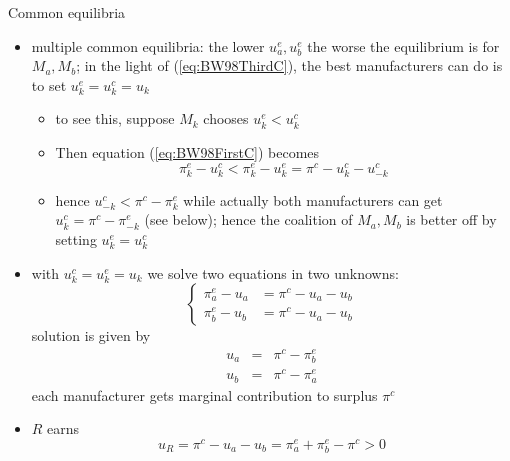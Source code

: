 \documentclass[11pt,english]{beamer}
\begin{document}
\begin{frame}[allowframebreaks]{Common equilibria}
\begin{itemize}
\begin{itemize}
\begin{equation*}
        \pi^c = \pi_a^e + [u_a^c-u_a^e] + u_b^c \geq \pi_a^e
      \end{equation*}
      because $u_a^c \geq u_a^e$ and $u_b^c \geq 0$
    \item suppose $\pi^c < \pi_a^e$, coalition $R$ and $M_a$ can
      deviate from common outcome and earn $\pi_a^e > \pi^c -u_b^c$
    \end{itemize}
  \item multiple common equilibria: the lower $u_a^e,u_b^e$ the worse
    the equilibrium is for $M_a,M_b$; in the light of
    (\ref{eq:BW98ThirdC}), the best manufacturers can do is to
    set $u_k^e=u_k^c=u_k$
    \begin{itemize}
    \item to see this, suppose $M_k$ chooses $u_k^e < u_k^c$
    \item Then equation (\ref{eq:BW98FirstC}) becomes
      \begin{equation*}
        \pi_k^e-u_k^c < \pi_k^e-u_k^e =\pi^c -u_k^c-u_{-k}^c
      \end{equation*}
    \item hence $u_{-k}^c < \pi^c-\pi^e_k$ while actually both
      manufacturers can get $u_{k}^c = \pi^c-\pi^e_{-k}$ (see below);
      hence the coalition of $M_a,M_b$ is better off by setting  $u_k^e=u_k^c$
    \end{itemize}
  \item with $u_k^c=u_k^e=u_k$ we solve two equations in two unknowns:
    \begin{equation*}
      \begin{cases}
        \pi_a^e -u_a &= \pi^c -u_a-u_b \\
        \pi_b^e -u_b &= \pi^c -u_a-u_b
      \end{cases}
    \end{equation*}
    solution is given by
    \begin{eqnarray*}
      u_a &=& \pi^c-\pi^e_b \\
      u_b &=& \pi^c -\pi^e_a
    \end{eqnarray*}
    each manufacturer gets marginal contribution to surplus $\pi^c$
  \item $R$ earns
    \begin{equation}
      \label{eq:BW98uR}
      u_R = \pi^c -u_a-u_b = \pi_a^e +\pi_b^e - \pi^c >0
    \end{equation}
  \end{itemize}
\end{frame}
\end{document}
